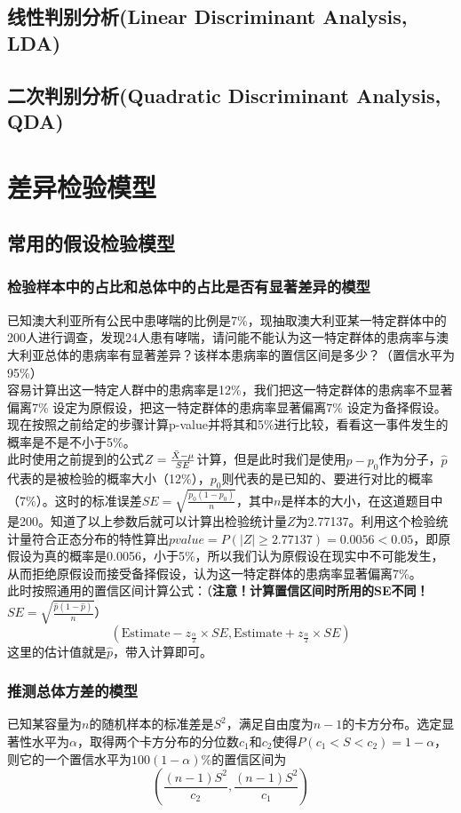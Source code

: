 \documentclass{MGLSA-cn-book-math}
\begin{document}
\section{线性判别分析(Linear Discriminant Analysis, LDA)}

\section{二次判别分析(Quadratic Discriminant Analysis, QDA)}

\chapter{差异检验模型}
\section{常用的假设检验模型}
\subsection{检验样本中的占比和总体中的占比是否有显著差异的模型}
已知澳大利亚所有公民中患哮喘的比例是7\%，现抽取澳大利亚某一特定群体中的200人进行调查，发现24人患有哮喘，请问能不能认为这一特定群体的患病率与澳大利亚总体的患病率有显著差异？该样本患病率的置信区间是多少？（置信水平为95\%）\\
\indent 容易计算出这一特定人群中的患病率是12\%，我们把这一特定群体的患病率不显著偏离7\% 设定为原假设，把这一特定群体的患病率显著偏离7\% 设定为备择假设。现在按照之前给定的步骤计算p-value并将其和5\%进行比较，看看这一事件发生的概率是不是不小于5\%。\\
\indent 此时使用之前提到的公式$Z=\frac{\Bar{X}-\mu}{SE}$计算，但是此时我们是使用$\hat{p}-p_0$作为分子，$\hat{p}$代表的是被检验的概率大小（12\%），$p_0$则代表的是已知的、要进行对比的概率（7\%）。这时的标准误差$SE=\sqrt{\frac{p_0\left(1-p_0\right)}{n}}$，其中$n$是样本的大小，在这道题目中是200。知道了以上参数后就可以计算出检验统计量$Z$为2.77137。利用这个检验统计量符合正态分布的特性算出$pvalue=P(|Z|\geq 2.77137)=0.0056<0.05$，即原假设为真的概率是0.0056，小于5\%，所以我们认为原假设在现实中不可能发生，从而拒绝原假设而接受备择假设，认为这一特定群体的患病率显著偏离7\%。\\
\indent 此时按照通用的置信区间计算公式：（\textbf{注意！计算置信区间时所用的SE不同！$SE=\sqrt{\frac{\hat{p}\left(1-\hat{p}\right)}{n}}$}）
\[
\left(\text{Estimate}-z_{\frac{\alpha}{2}}\times SE,\text{Estimate}+z_{\frac{\alpha}{2}}\times SE\right)
\]
\indent 这里的估计值就是$\hat{p}$，带入计算即可。
\subsection{推测总体方差的模型}
已知某容量为$n$的随机样本的标准差是$S^2$，满足自由度为$n-1$的卡方分布。选定显著性水平为$\alpha$，取得两个卡方分布的分位数$c_1$和$c_2$使得$P(c_1<S<c_2)=1-\alpha$，则它的一个置信水平为$100(1-\alpha)\%$的置信区间为
\[
	\left(\frac{(n-1)S^2}{c_2},\frac{(n-1)S^2}{c_1}\right)
\]
\end{document}
